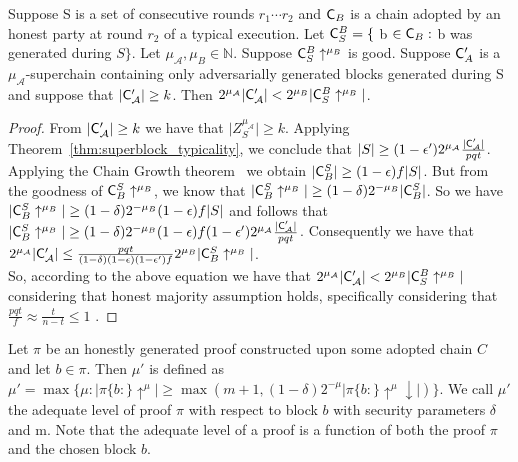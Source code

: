 \begin{lemma}
	Suppose S is a set of consecutive rounds $r_1 \cdots r_2$
	and $\mathsf{C}_B$ is a chain adopted by an honest party at round $r_2$ of a typical
	execution. Let $\mathsf{C}^{B}_{S} = \{$ b $\in \mathsf{C}_B:$ b was generated during $S\}$. Let
	$\mu_\mathcal{A}, \mu_B \in \mathbb{N}$. Suppose $\mathsf{C}^{B}_{S}\uparrow^{\mu_B}$ is good.
	Suppose $\mathsf{C}'_A$ is a $\mu_\mathcal{A}$-superchain containing only adversarially generated
	blocks generated during S and suppose that $\vert \mathsf{C}'_\mathcal{A} \vert \geq k$. Then
	$2^{\mu_\mathcal{A}} \vert \mathsf{C}'_\mathcal{A} \vert <  2^{\mu_B} \vert    \mathsf{C}^{B}_{S}\uparrow^{\mu_B}\vert $.
	\label{lemma:honest_vs_pure_adversarial_subchain}
\end{lemma}
\begin{proof}
	From $\vert \mathsf{C}'_\mathcal{A} \vert \geq k$ we have that $\vert Z^{\mu_\mathcal{A}}_S
	\vert \geq k$. Applying Theorem~\ref{thm:superblock_typicality}, we conclude that $\vert S \vert \geq
	(1-\epsilon')2^{\mu_\mathcal{A}} \frac{\vert \mathsf{C}'_\mathcal{A} \vert}{pqt}$. Applying the Chain Growth
	theorem~\cite{backbone} we obtain $\vert \mathsf{C}_{B}^S \vert \geq (1 - \epsilon)f
	\vert S \vert$. But from the goodness of $\mathsf{C}_{B}^S \uparrow^{\mu_B}$, we know
	that $\vert \mathsf{C}_{B}^S\uparrow^{\mu_B} \vert \geq (1 - \delta)2^{-\mu_B} \vert
	\mathsf{C}_{B}^S \vert $. So we have $\vert \mathsf{C}_{B}^S\uparrow^{\mu_B} \vert \geq
	(1 - \delta)2^{-\mu_B} (1 - \epsilon)f \vert S \vert $ and follows that
	$\vert \mathsf{C}_{B}^S\uparrow^{\mu_B} \vert \geq (1 - \delta)2^{-\mu_B} (1 - \epsilon)f
	(1-\epsilon')2^{\mu_\mathcal{A}} \frac{\vert \mathsf{C}'_\mathcal{A} \vert}{pqt} $. Consequently we have that
	$2^{\mu_\mathcal{A}} \vert \mathsf{C}'_\mathcal{A} \vert \leq \frac{pqt}{(1- \delta)(1-\epsilon)(1-\epsilon')f}
	2^{\mu_B} \vert \mathsf{C}_{B}^S\uparrow^{\mu_B} \vert $.   \\

	So, according to the above equation we have that $2^{\mu_\mathcal{A}} \vert \mathsf{C}'_\mathcal{A} \vert
	<  2^{\mu_B} \vert    \mathsf{C}^{B}_{S}\uparrow^{\mu_B}\vert $ considering that honest
	majority assumption holds, specifically considering that $ \frac{pqt}{f} \approx
	\frac{t}{n-t} \leq 1 $ .
\end{proof}

\begin{defn}
	Let $\pi$ be an
	honestly generated proof constructed upon some adopted chain $C$ and let $b \in 
	\pi $. Then $\mu'$ is defined as $\mu' = \max \{ \mu: \vert \pi\{b:\}\uparrow^{\mu}
	\vert \geq \max( m+1, (1-\delta)2^{-\mu} \vert \pi\{b:\}\uparrow^{\mu}\downarrow \vert )\}$.
	We call $\mu'$ the adequate level of proof $\pi$ with respect to block $b$ with
	security parameters $\delta$ and m. Note that the adequate level of a proof is a
	function of both the proof $\pi$ and the chosen block $b$.
\end{defn}



